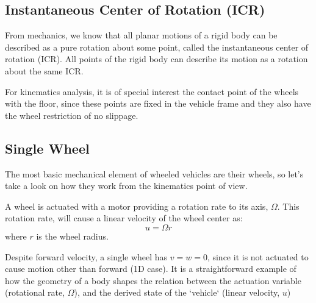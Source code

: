 \subsection{Instantaneous Center of Rotation (ICR)}
From mechanics, we know that all planar motions of a rigid body can be described as a pure rotation about some point, called the instantaneous center of rotation (ICR). All points of the rigid body can describe its motion as a rotation about the same ICR. 

For kinematics analysis, it is of special interest the contact point of the wheels with the floor, since these points are fixed in the vehicle frame and they also have the wheel restriction of no slippage. 


\subsection{Single Wheel}
\label{subsec:single_wheel}
The most basic mechanical element of wheeled vehicles are their wheels, so let's take a look on how they work from the kinematics point of view.

A wheel is actuated with a motor providing a rotation rate to its axis, $\Omega$. This rotation rate, will cause a linear velocity of the wheel center as: 
\begin{equation}
 u = \Omega r
\end{equation}
where $r$ is the wheel radius. 

Despite forward velocity, a single wheel has $v = w = 0$, since it is not actuated to cause motion other than forward (1D case). It is a straightforward example of how the geometry of a body shapes the relation between the actuation variable (rotational rate, $\Omega$), and the derived state of the `vehicle` (linear velocity, $u$)


